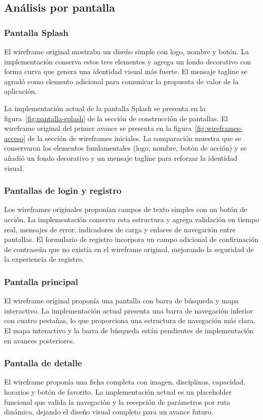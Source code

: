 \subsection{An\'alisis por pantalla}

\subsubsection{Pantalla Splash}

El wireframe original mostraba un dise\~no simple con logo, nombre y bot\'on.
La implementaci\'on conserva estos tres elementos y agrega un fondo decorativo
con forma curva que genera una identidad visual m\'as fuerte. El mensaje tagline
se agrad\'o como elemento adicional para comunicar la propuesta de valor de la
aplicaci\'on.

La implementaci\'on actual de la pantalla Splash se presenta en la
figura~\ref{fig:pantalla-splash} de la secci\'on de construcci\'on de
pantallas. El wireframe original del primer avance se presenta en la
figura~\ref{fig:wireframes-acceso} de la secci\'on de wireframes iniciales.
La comparaci\'on muestra que se conservaron los elementos fundamentales
(logo, nombre, bot\'on de acci\'on) y se a\~nadi\'o un fondo decorativo
y un mensaje tagline para reforzar la identidad visual.

\subsubsection{Pantallas de login y registro}

Los wireframes originales propon\'ian campos de texto simples con un bot\'on de
acci\'on. La implementaci\'on conserva esta estructura y agrega
validaci\'on en tiempo real, mensajes de error, indicadores de carga y
enlaces de navegaci\'on entre pantallas. El formulario de registro incorpora
un campo adicional de confirmaci\'on de contrase\~na que no exist\'ia en el
wireframe original, mejorando la seguridad de la experiencia de registro.

\subsubsection{Pantalla principal}

El wireframe original propon\'ia una pantalla con barra de b\'usqueda y mapa
interactivo. La implementaci\'on actual presenta una barra de navegaci\'on
inferior con cuatro pesta\~nas, lo que proporciona una estructura de
navegaci\'on m\'as clara. El mapa interactivo y la barra de b\'usqueda est\'an
pendientes de implementaci\'on en avances posteriores.

\subsubsection{Pantalla de detalle}

El wireframe propon\'ia una ficha completa con imagen, disciplinas, capacidad,
horarios y bot\'on de favorito. La implementaci\'on actual es un placeholder
funcional que valida la navegaci\'on y la recepci\'on de par\'ametros por ruta
din\'amica, dejando el dise\~no visual completo para un avance futuro.

